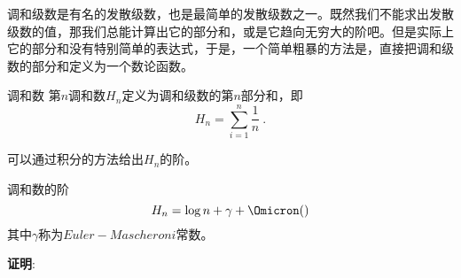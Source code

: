 

调和级数是有名的发散级数，也是最简单的发散级数之一。既然我们不能求出发散级数的值，那我们总能计算出它的部分和，或是它趋向无穷大的阶吧。但是实际上它的部分和没有特别简单的表达式，于是，一个简单粗暴的方法是，直接把调和级数的部分和定义为一个数论函数。

\begin{definition}{调和数}
第$n$调和数$H_n$定义为调和级数的第$n$部分和，即
\begin{equation}
H_n = \sum_{i=1}^n\frac{1}{n}~.
\end{equation}
\end{definition}

可以通过积分的方法给出$H_n$的阶。

\begin{theorem}{调和数的阶}
\begin{equation}
H_n = \log n + \gamma + \Omicron()
\end{equation}
其中$\gamma$称为$Euler-Mascheroni$常数。
\end{theorem}

\textbf{证明}:

\begin{equation}
\begin{aligned}
\end{aligned}
\end{equation}


